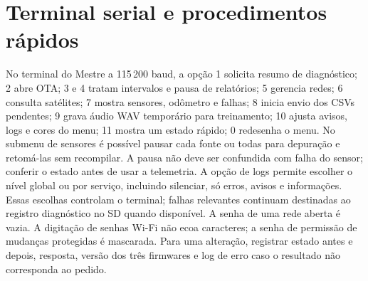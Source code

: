 \section{Terminal serial e procedimentos rápidos}
No terminal do Mestre a 115\,200 baud, a opção 1 solicita resumo de diagnóstico; 2 abre OTA; 3 e 4 tratam intervalos e pausa de relatórios; 5 gerencia redes; 6 consulta satélites; 7 mostra sensores, odômetro e falhas; 8 inicia envio dos CSVs pendentes; 9 grava áudio WAV temporário para treinamento; 10 ajusta avisos, logs e cores do menu; 11 mostra um estado rápido; 0 redesenha o menu. No submenu de sensores é possível pausar cada fonte ou todas para depuração e retomá-las sem recompilar. A pausa não deve ser confundida com falha do sensor; conferir o estado antes de usar a telemetria. A opção de logs permite escolher o nível global ou por serviço, incluindo silenciar, só erros, avisos e informações. Essas escolhas controlam o terminal; falhas relevantes continuam destinadas ao registro diagnóstico no SD quando disponível. A senha de uma rede aberta é vazia. A digitação de senhas Wi-Fi não ecoa caracteres; a senha de permissão de mudanças protegidas é mascarada. Para uma alteração, registrar estado antes e depois, resposta, versão dos três firmwares e log de erro caso o resultado não corresponda ao pedido.
